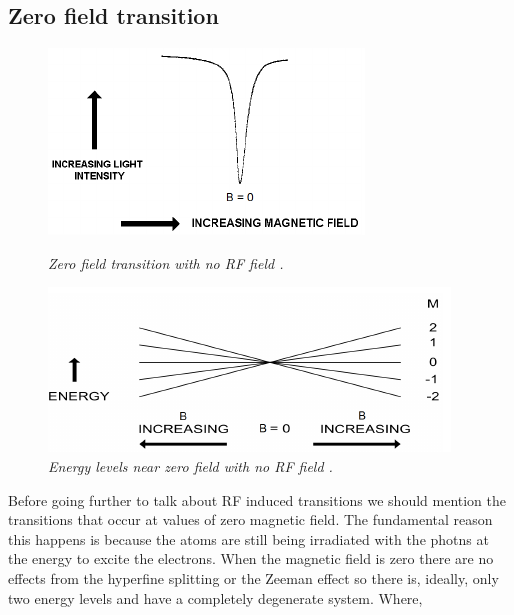 \documentclass[twocolumn]{article}
\begin{document}
\subsection{Zero field transition}
\begin{figure}
\begin{minipage}[t]{0.44\textwidth}
\includegraphics[width=\linewidth]{pictures/zero-field-trans.png}
\caption{\textit{Zero field transition with no RF field \cite{ref:3}.}}
\label{fig:11}
\end{minipage}
\hfill
\begin{minipage}[t]{0.44\textwidth}
\includegraphics[width=\linewidth]{pictures/energy-zero.png}
\caption{\textit{Energy levels near zero field with no RF field \cite{ref:3}.}}
\label{fig:12}
\end{minipage}
\end{figure}
Before going further to talk about RF induced transitions we should mention the 
transitions that occur at values of zero magnetic field. The fundamental reason 
this happens is because the atoms are still being irradiated with the photns 
at the energy to excite the electrons. When the magnetic field is zero there 
are no effects from the hyperfine splitting or the Zeeman effect so there is, 
ideally, only two energy levels and have a completely degenerate system. Where, 
\end{document}
